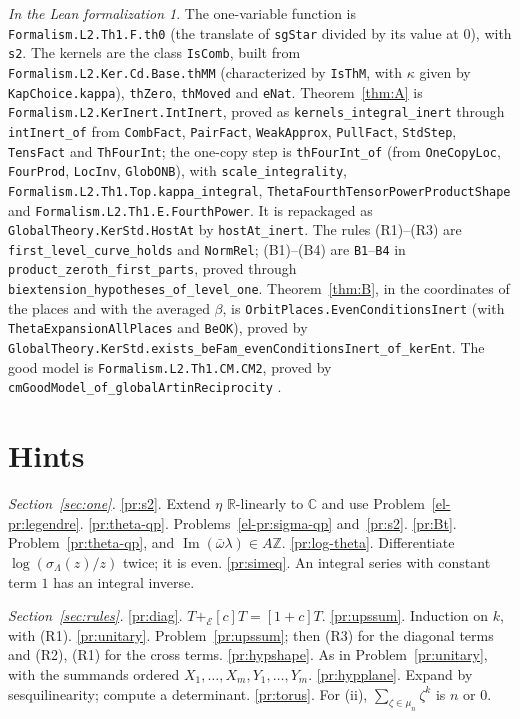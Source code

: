 \documentclass[reqno]{amsart}
\theoremstyle{definition}
\theoremstyle{plain}
\theoremstyle{remark}
\newtheorem*{leanremark}{In the Lean formalization}
\newcommand{\Z}{\mathbb Z}
\newcommand{\C}{\mathbb C}
\newcommand{\Ec}{\mathcal E}
\newcommand{\tl}[1]{\texttt{#1}}
\newcommand{\pe}{+_{\Ec}}
\begin{document}
\begin{leanremark}\sloppy
The one-variable function is \tl{Formalism.L2.Th1.F.th0} (the translate of \tl{sgStar} divided by its value at \(0\)), with \tl{s2}.  The kernels are the class \tl{IsComb}, built from \tl{Formalism.L2.Ker.Cd.Base.thMM} (characterized by \tl{IsThM}, with \(\kappa\) given by \tl{KapChoice.kappa}), \tl{thZero}, \tl{thMoved} and \tl{eNat}.  Theorem~\ref{thm:A} is \tl{Formalism.L2.KerInert.IntInert}, proved as \tl{kernels\_integral\_inert} through \tl{intInert\_of} from \tl{CombFact}, \tl{PairFact}, \tl{WeakApprox}, \tl{PullFact}, \tl{StdStep}, \tl{TensFact} and \tl{ThFourInt}; the one-copy step is \tl{thFourInt\_of} (from \tl{OneCopyLoc}, \tl{FourProd}, \tl{LocInv}, \tl{GlobONB}), with \tl{scale\_integrality}, \tl{Formalism.L2.Th1.Top.kappa\_integral}, \tl{ThetaFourthTensorPowerProductShape} and \tl{Formalism.L2.Th1.E.FourthPower}.  It is repackaged as \tl{GlobalTheory.KerStd.HostAt} by \tl{hostAt\_inert}.  The rules (R1)--(R3) are \tl{first\_level\_curve\_holds} and \tl{NormRel}; (B1)--(B4) are \tl{B1}--\tl{B4} in \tl{product\_zeroth\_first\_parts}, proved through \tl{biextension\_hypotheses\_of\_level\_one}.  Theorem~\ref{thm:B}, in the coordinates of the places and with the averaged \(\beta\), is \tl{OrbitPlaces.EvenConditionsInert} (with \tl{ThetaExpansionAllPlaces} and \tl{BeOK}), proved by \tl{GlobalTheory.KerStd.exists\_beFam\_evenConditionsInert\_of\_kerEnt}.  The good model is \tl{Formalism.L2.Th1.CM.CM2}, proved by \tl{cmGoodModel\_of\_globalArtinReciprocity} \cite{Lean}.
\end{leanremark}

\section*{Hints}
\noindent\emph{Section~\ref{sec:one}.}
\ref{pr:s2}. Extend \(\eta\) \(\mathbb R\)-linearly to \(\C\) and use Problem~\ref{el-pr:legendre}.
\ref{pr:theta-qp}. Problems~\ref{el-pr:sigma-qp} and~\ref{pr:s2}.
\ref{pr:Bt}. Problem~\ref{pr:theta-qp}, and \(\operatorname{Im}(\bar\omega\lambda)\in A\Z\).
\ref{pr:log-theta}. Differentiate \(\log(\sigma_\Lambda(z)/z)\) twice; it is even.
\ref{pr:simeq}. An integral series with constant term \(1\) has an integral inverse.

\noindent\emph{Section~\ref{sec:rules}.}
\ref{pr:diag}. \(T\pe[c]T=[1+c]T\).
\ref{pr:upssum}. Induction on \(k\), with (R1).
\ref{pr:unitary}. Problem~\ref{pr:upssum}; then (R3) for the diagonal terms and (R2), (R1) for the cross terms.
\ref{pr:hypshape}. As in Problem~\ref{pr:unitary}, with the summands ordered \(X_1,\dots,X_m,Y_1,\dots,Y_m\).
\ref{pr:hypplane}. Expand by sesquilinearity; compute a determinant.
\ref{pr:torus}. For (ii), \(\sum_{\zeta\in\mu_n}\zeta^k\) is \(n\) or \(0\).
\end{document}
